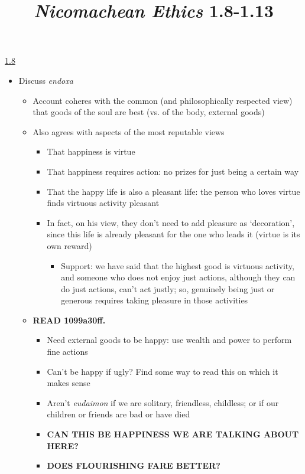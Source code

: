 \documentclass[11pt]{article}
\title{\emph{Nicomachean Ethics} 1.8-1.13}
\author{}
\date{}
\begin{document}
\maketitle

\noindent\underline{1.8}

\begin{itemize}\item{Discuss \emph{endoxa}}

\begin{itemize}\item{Account coheres with the common (and philosophically respected view) that goods of the soul are best (vs. of the body, external goods)}\item{Also agrees with aspects of the most reputable views}

\begin{itemize}\item{That happiness is virtue}\item{That happiness requires action: no prizes for just being a certain way}\item{That the happy life is also a pleasant life: the person who loves virtue finds virtuous activity pleasant}\item{In fact, on his view, they don't need to add pleasure as `decoration', since this life is already pleasant for the one who leads it (virtue is its own reward)}\begin{itemize}\item{Support: we have said that the highest good is virtuous activity, and someone who does not enjoy just actions, although they can do just actions, can't act justly; so, genuinely being just or generous requires taking pleasure in those activities}\end{itemize}

\end{itemize}

\item{\textbf{READ 1099a30ff.}}

\begin{itemize}\item{Need external goods to be happy: use wealth and power to perform fine actions}\item{Can't be happy if ugly? Find some way to read this on which it makes sense}\item{Aren't \emph{eudaimon} if we are solitary, friendless, childless; or if our children or friends are bad or have died}\item{\textbf{CAN THIS BE HAPPINESS WE ARE TALKING ABOUT HERE?}}\item{\textbf{DOES FLOURISHING FARE BETTER?}}\end{itemize}

\end{itemize}

\end{itemize}
\end{document}
